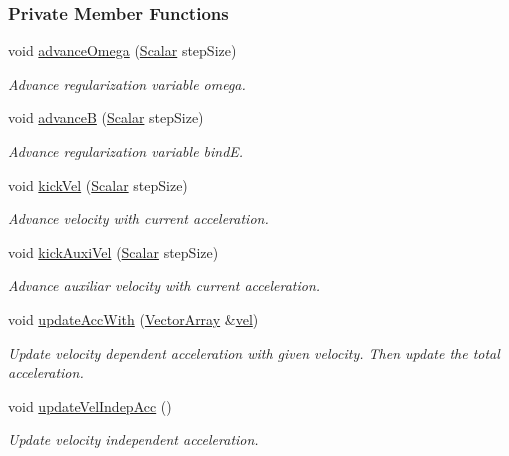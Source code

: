 \subsubsection*{Private Member Functions}
\begin{DoxyCompactItemize}
\item 
void \mbox{\hyperlink{classregu_system_ad04ed572a5718219d506af6cd924a395}{advance\+Omega}} (\mbox{\hyperlink{classregu_system_aca8ee2c387943164ee3ea68370fc3ac0}{Scalar}} step\+Size)
\begin{DoxyCompactList}\small\item\em Advance regularization variable omega. \end{DoxyCompactList}\item 
void \mbox{\hyperlink{classregu_system_a0a74b00e0e5124a27d0dc90b969f83cc}{advanceB}} (\mbox{\hyperlink{classregu_system_aca8ee2c387943164ee3ea68370fc3ac0}{Scalar}} step\+Size)
\begin{DoxyCompactList}\small\item\em Advance regularization variable bindE. \end{DoxyCompactList}\item 
void \mbox{\hyperlink{classregu_system_a16cf42c1efb79a8ed5f9fecad7ad13dc}{kick\+Vel}} (\mbox{\hyperlink{classregu_system_aca8ee2c387943164ee3ea68370fc3ac0}{Scalar}} step\+Size)
\begin{DoxyCompactList}\small\item\em Advance velocity with current acceleration. \end{DoxyCompactList}\item 
void \mbox{\hyperlink{classregu_system_a53e1d725a1df2b65029f622a17364b1e}{kick\+Auxi\+Vel}} (\mbox{\hyperlink{classregu_system_aca8ee2c387943164ee3ea68370fc3ac0}{Scalar}} step\+Size)
\begin{DoxyCompactList}\small\item\em Advance auxiliar velocity with current acceleration. \end{DoxyCompactList}\item 
void \mbox{\hyperlink{classregu_system_a5928c1085fa45b17bfd0da8661819852}{update\+Acc\+With}} (\mbox{\hyperlink{classregu_system_aa4ecefb5c437230b994171e231450be8}{Vector\+Array}} \&\mbox{\hyperlink{classparticle_system_a545da170c4d59f18c6ddb18817cb5f3e}{vel}})
\begin{DoxyCompactList}\small\item\em Update velocity dependent acceleration with given velocity. Then update the total acceleration. \end{DoxyCompactList}\item 
void \mbox{\hyperlink{classregu_system_a9ef1a5d582d3764adf3f3f35e5fac431}{update\+Vel\+Indep\+Acc}} ()
\begin{DoxyCompactList}\small\item\em Update velocity independent acceleration. \end{DoxyCompactList}\end{DoxyCompactItemize}
